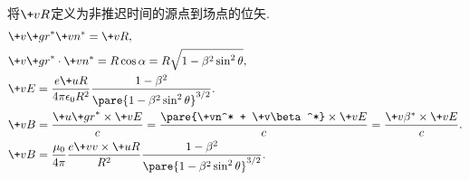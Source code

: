 \documentclass[hidelinks]{ctexart}
\begin{document}
\begin{sample}
    \begin{ex}
        将$\+vR$定义为非推迟时间的源点到场点的位矢.
        \begin{align*}
            & \+v{\+gr}^* \+vn^* = \+vR, \\
            & \+v{\+gr}^* \cdot \+vn^* = R\cos\alpha = R\sqrt{1-\beta^2 \sin^2\theta},\\
            & \+vE = \frac{e\+u{R}}{4\pi\epsilon_0 R^2} \frac{1-\beta^2}{\pare{1-\beta^2\sin^2\theta}^{3/2}}. \\
            & \+vB = \frac{\+u{\+gr}^*\times \+vE}{c} = \frac{\pare{\+vn^* + \+v\beta^*}\times \+vE}{c} = \frac{\+v\beta^*\times \+vE}{c}. \\
            & \+vB = \frac{\mu_0}{4\pi}\frac{e\+vv\times \+u{R}}{R^2} \frac{1-\beta^2}{\pare{1-\beta^2\sin^2\theta}^{3/2}}.
        \end{align*}
    \end{ex}
\end{sample}
\end{document}
